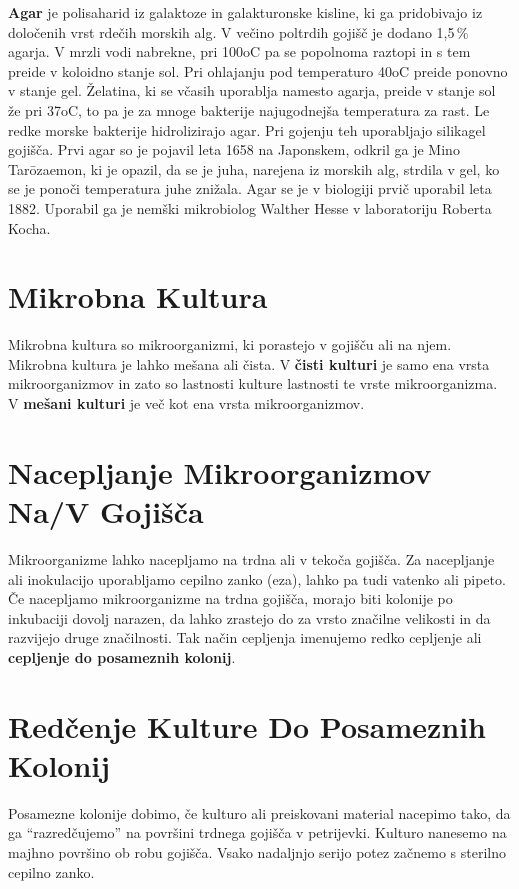 \documentclass[12pt, a4paper, oneside]{report}
\begin{document}
\textbf{Agar} je polisaharid iz galaktoze in galakturonske kisline, ki ga pridobivajo iz določenih vrst rdečih morskih alg. V večino poltrdih gojišč je dodano 1,5\,\% agarja. V mrzli vodi nabrekne, pri 100oC pa se popolnoma raztopi in s tem preide v koloidno stanje sol. Pri ohlajanju pod temperaturo 40oC preide ponovno v stanje gel. Želatina, ki se včasih uporablja namesto agarja, preide v stanje sol že pri 37oC, to pa je za mnoge bakterije najugodnejša temperatura za rast. Le redke morske bakterije hidrolizirajo agar. Pri gojenju teh uporabljajo silikagel gojišča. Prvi agar so je pojavil leta 1658 na Japonskem, odkril ga je Mino Tarōzaemon, ki je opazil, da se je juha, narejena iz morskih alg, strdila v gel, ko se je ponoči temperatura juhe znižala. Agar se je v biologiji prvič uporabil leta 1882. Uporabil ga je nemški mikrobiolog Walther Hesse v laboratoriju Roberta Kocha.

\section{Mikrobna Kultura}

Mikrobna kultura so mikroorganizmi, ki porastejo v gojišču ali na njem. Mikrobna kultura je lahko mešana ali čista. V \textbf{čisti kulturi} je samo ena vrsta mikroorganizmov in zato so lastnosti kulture lastnosti te vrste mikroorganizma. V \textbf{mešani kulturi} je več kot ena vrsta mikroorganizmov.

\section{Nacepljanje Mikroorganizmov Na/V Gojišča}

Mikroorganizme lahko nacepljamo na trdna ali v tekoča gojišča. Za nacepljanje ali inokulacijo uporabljamo cepilno zanko (eza), lahko pa tudi vatenko ali pipeto. Če nacepljamo mikroorganizme na trdna gojišča, morajo biti kolonije po inkubaciji dovolj narazen, da lahko zrastejo do za vrsto značilne velikosti in da razvijejo druge značilnosti. Tak način cepljenja imenujemo redko cepljenje ali \textbf{cepljenje do posameznih kolonij}.

\section{Redčenje Kulture Do Posameznih Kolonij}

Posamezne kolonije dobimo, če kulturo ali preiskovani material nacepimo tako, da ga ``razredčujemo'' na površini trdnega gojišča v petrijevki. Kulturo nanesemo na majhno površino ob robu gojišča. Vsako nadaljnjo serijo potez začnemo s sterilno cepilno zanko.
\end{document}
